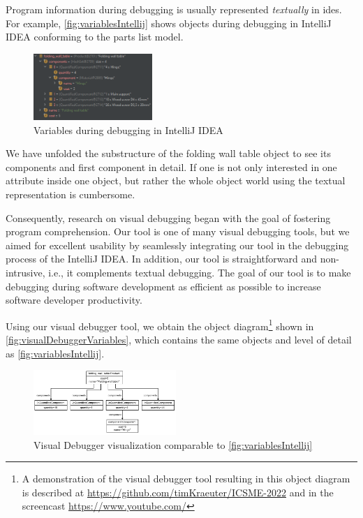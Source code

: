 \documentclass[conference]{IEEEtran}
\newcommand{\intellij}{IntelliJ IDEA}
\newcommand{\screencast}{\url{https://www.youtube.com/}}
\begin{document}
Program information during debugging is usually represented \textit{textually} in \glspl*{ide}.
For example, \autoref{fig:variablesIntellij} shows objects during debugging in \intellij{} conforming to the parts list model. 

\begin{figure}[h]
    \centering
    \includegraphics[width=0.4\textwidth]{images/variables.png}
    \caption{Variables during debugging in \intellij}
    \label{fig:variablesIntellij}
\end{figure}

We have unfolded the substructure of the \textsf{folding wall table} object to see its components and first component in detail.
If one is not only interested in one attribute inside one object, but rather the whole object world using the textual representation is cumbersome.

Consequently, research on visual debugging began with the goal of fostering program comprehension.
Our tool is one of many visual debugging tools, but we aimed for excellent usability by seamlessly integrating our tool in the debugging process of the \intellij{}.
In addition, our tool is straightforward and non-intrusive, i.e., it complements textual debugging.
The goal of our tool is to make debugging during software development as efficient as possible to increase software developer productivity.

Using our visual debugger tool, we obtain the object diagram\footnote{A demonstration of the visual debugger tool resulting in this object diagram is described at \url{https://github.com/timKraeuter/ICSME-2022} and in the screencast \screencast} shown in \autoref{fig:visualDebuggerVariables}, which contains the same objects and level of detail as \autoref{fig:variablesIntellij}.

\begin{figure}[h]
    \centering
    \includegraphics[width=0.48\textwidth]{images/VD-parts list object diagram.pdf}
    \caption{Visual Debugger visualization comparable to \autoref{fig:variablesIntellij}}
    \label{fig:visualDebuggerVariables}
\end{figure}
\end{document}
